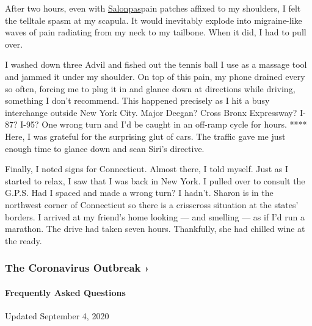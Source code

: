 After two hours, even with
\href{https://us.hisamitsu/pain-relief-products}{Salonpas}pain patches
affixed to my shoulders, I felt the telltale spasm at my scapula. It
would inevitably explode into migraine-like waves of pain radiating from
my neck to my tailbone. When it did, I had to pull over.

I washed down three Advil and fished out the tennis ball I use as a
massage tool and jammed it under my shoulder. On top of this pain, my
phone drained every so often, forcing me to plug it in and glance down
at directions while driving, something I don't recommend. This happened
precisely as I hit a busy interchange outside New York City. Major
Deegan? Cross Bronx Expressway? I-87? I-95? One wrong turn and I'd be
caught in an off-ramp cycle for hours. **** Here, I was grateful for the
surprising glut of cars. The traffic gave me just enough time to glance
down and scan Siri's directive.

Finally, I noted signs for Connecticut. Almost there, I told myself.
Just as I started to relax, I saw that I was back in New York. I pulled
over to consult the G.P.S. Had I spaced and made a wrong turn? I hadn't.
Sharon is in the northwest corner of Connecticut so there is a
crisscross situation at the states' borders. I arrived at my friend's
home looking --- and smelling --- as if I'd run a marathon. The drive
had taken seven hours. Thankfully, she had chilled wine at the ready.

\href{https://www.nytimes3xbfgragh.onion/news-event/coronavirus?action=click\&pgtype=Article\&state=default\&region=MAIN_CONTENT_3\&context=storylines_faq}{}

\hypertarget{the-coronavirus-outbreak-}{%
\subsubsection{The Coronavirus Outbreak
›}\label{the-coronavirus-outbreak-}}

\hypertarget{frequently-asked-questions}{%
\paragraph{Frequently Asked
Questions}\label{frequently-asked-questions}}

Updated September 4, 2020

